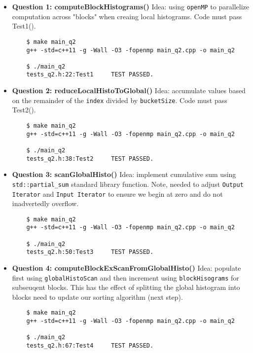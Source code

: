 \documentclass[12pt,letterpaper,twoside]{article}
\begin{document}
\begin{itemize}
    \item \textbf{Question 1: computeBlockHistograms()} Idea: using \texttt{openMP}
    to parallelize computation across "blocks" when creaing local histograms.
    Code must pass Test1().

    \begin{verbatim}
    $ make main_q2
    g++ -std=c++11 -g -Wall -O3 -fopenmp main_q2.cpp -o main_q2

    $ ./main_q2
    tests_q2.h:22:Test1     TEST PASSED.
    \end{verbatim}

    \item \textbf{Question 2: reduceLocalHistoToGlobal()} Idea: accumulate values 
    based on the remainder of the \texttt{index} divided by \texttt{bucketSize}.
    Code must pass Test2().

    \begin{verbatim}
    $ make main_q2
    g++ -std=c++11 -g -Wall -O3 -fopenmp main_q2.cpp -o main_q2

    $ ./main_q2
    tests_q2.h:38:Test2     TEST PASSED.
    \end{verbatim}

    \item \textbf{Question 3: scanGlobalHisto()} Idea: implement cumulative sum 
    using \texttt{std::partial\_sum} standard library function. Note, needed to 
    adjust \texttt{Output Iterator} and \texttt{Input Iterator} to ensure we 
    begin at zero and do not inadvertedly overflow.

    \begin{verbatim}
    $ make main_q2
    g++ -std=c++11 -g -Wall -O3 -fopenmp main_q2.cpp -o main_q2

    $ ./main_q2
    tests_q2.h:50:Test3     TEST PASSED.
    \end{verbatim}

    \item \textbf{Question 4: computeBlockExScanFromGlobalHisto()} Idea: populate first
    using \texttt{globalHistoScan} and then increment using \texttt{blockHisograms}
    for subseuqent blocks. This has the effect of splitting the global histogram
    into blocks need to update our sorting algorithm (next step).
    
    \begin{verbatim}
    $ make main_q2
    g++ -std=c++11 -g -Wall -O3 -fopenmp main_q2.cpp -o main_q2

    $ ./main_q2
    tests_q2.h:67:Test4     TEST PASSED.
    \end{verbatim}


\end{itemize}
\end{document}
